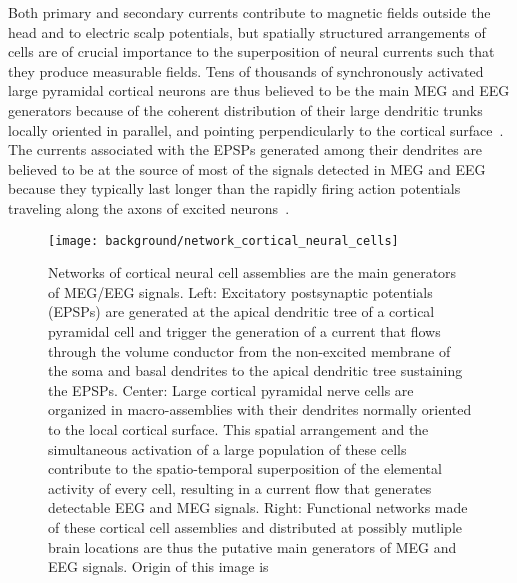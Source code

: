 Both primary and secondary currents contribute to magnetic fields outside the head and to electric scalp potentials, but spatially structured arrangements of cells are of crucial importance to the superposition of neural currents such that they produce measurable fields. Tens of thousands of synchronously activated large pyramidal cortical neurons are thus believed to be the main MEG and EEG generators because of the coherent distribution of their large dendritic trunks locally oriented in parallel, and pointing perpendicularly to the cortical surface~\cite{nunez2000relationship}. The currents associated with the EPSPs generated among their dendrites are believed to be at the source of most of the signals detected in MEG and EEG because they typically last longer than the rapidly firing action potentials traveling along the axons of excited neurons~\cite{nunez2006electric}. %

\begin{figure}
	\centering
	\texttt{[image: background/network\_cortical\_neural\_cells]}
    \caption{Networks of cortical neural cell assemblies are the main generators of MEG/EEG signals. Left: Excitatory postsynaptic potentials (EPSPs) are generated at the apical dendritic tree of a cortical pyramidal cell and trigger the generation of a current that flows through the volume conductor from the non-excited membrane of the soma and basal dendrites to the apical dendritic tree sustaining the EPSPs. Center:  Large cortical pyramidal nerve cells are organized in macro-assemblies with their dendrites normally oriented to the local cortical surface. This spatial arrangement
and the simultaneous activation of a large population of these cells contribute to the spatio-temporal superposition of the elemental activity of every cell, resulting in a current flow that generates detectable EEG and MEG signals. Right: Functional networks made of these cortical cell assemblies and distributed at possibly mutliple brain locations are thus the putative main generators of MEG and EEG signals. Origin of this image is~\cite{baillet2001electromagnetic}
    }
    \label{fig:network_cortical_neural_cells}
\end{figure}

